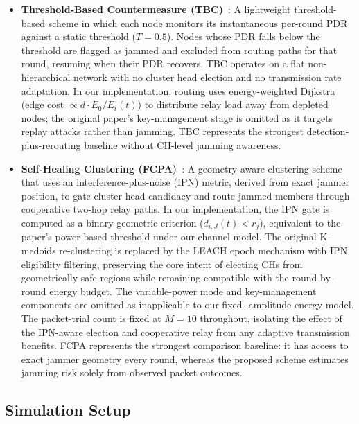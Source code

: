 \documentclass[conference]{IEEEtran}
\begin{document}
\begin{itemize}

    \item \textbf{Threshold-Based Countermeasure (TBC)}~\cite{11156845}:
    A lightweight threshold-based scheme in which each node monitors its
    instantaneous per-round PDR against a static threshold ($T = 0.5$).
    Nodes whose PDR falls below the threshold are flagged as jammed and
    excluded from routing paths for that round, resuming when their PDR
    recovers. TBC operates on a flat non-hierarchical network with no
    cluster head election and no transmission rate adaptation. In our
    implementation, routing uses energy-weighted Dijkstra (edge cost
    $\propto d \cdot E_0 / E_i(t)$) to distribute relay load away from
    depleted nodes; the original paper's key-management stage is omitted
    as it targets replay attacks rather than jamming. TBC represents the
    strongest detection-plus-rerouting baseline without CH-level jamming
    awareness.

    \item \textbf{Self-Healing Clustering (FCPA)}~\cite{s23156894}:
    A geometry-aware clustering scheme that uses an
    interference-plus-noise (IPN) metric, derived from exact jammer
    position, to gate cluster head candidacy and route jammed members
    through cooperative two-hop relay paths. In our implementation, the
    IPN gate is computed as a binary geometric criterion
    ($d_{i,J}(t) < r_j$), equivalent to the paper's power-based
    threshold under our channel model. The original K-medoids
    re-clustering is replaced by the LEACH epoch mechanism with IPN
    eligibility filtering, preserving the core intent of electing CHs
    from geometrically safe regions while remaining compatible with
    the round-by-round energy budget. The variable-power mode and
    key-management components are omitted as inapplicable to our fixed-
    amplitude energy model. The packet-trial count is fixed at $M = 10$ throughout,
    isolating the effect of the IPN-aware election and cooperative relay
    from any adaptive transmission benefits. FCPA represents the
    strongest comparison baseline: it has access to exact jammer geometry
    every round, whereas the proposed scheme estimates jamming risk
    solely from observed packet outcomes.

\end{itemize}

\subsection{Simulation Setup}
\end{document}
